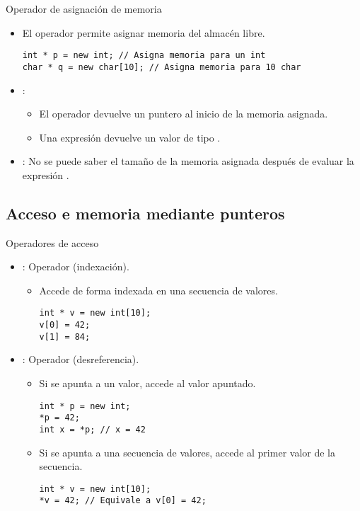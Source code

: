 \begin{frame}[t,fragile]{Operador de asignación de memoria}
\begin{itemize}
  \item El operador  permite asignar memoria del almacén libre.
\begin{lstlisting}
int * p = new int; // Asigna memoria para un int
char * q = new char[10]; // Asigna memoria para 10 char
\end{lstlisting}

  \item {}:
    \begin{itemize}
      \item El operador  devuelve un puntero al inicio de la memoria asignada.
      \item Una expresión   devuelve un valor de tipo .
    \end{itemize}

  \item {}: No se puede saber el tamaño de la memoria asignada 
        después de evaluar la expresión .
\end{itemize}
\end{frame}

\subsection{Acceso e memoria mediante punteros}

\begin{frame}[t,fragile]{Operadores de acceso}
\begin{itemize}
  \item {}: Operador \cppkey{[]} (indexación).
    \begin{itemize}
      \item Accede de forma indexada en una secuencia de valores.
\begin{lstlisting}
int * v = new int[10];
v[0] = 42;
v[1] = 84;
\end{lstlisting}
    \end{itemize}

  \item {}: Operador \cppkey{*} (desreferencia).
    \begin{itemize}
      \item Si se apunta a un valor, accede al valor apuntado.
\begin{lstlisting}
int * p = new int;
*p = 42;
int x = *p; // x = 42
\end{lstlisting}


      \item Si se apunta a una secuencia de valores, accede al primer valor de la secuencia.
\begin{lstlisting}
int * v = new int[10];
*v = 42; // Equivale a v[0] = 42;
\end{lstlisting}
    \end{itemize}
\end{itemize}
\end{frame}

